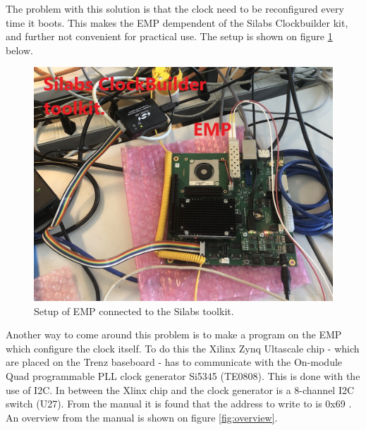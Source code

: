 The problem with this solution is that the clock need to be reconfigured every time it boots. This makes the EMP dempendent of the Silabs Clockbuilder kit, and further not convenient for practical use. The setup is shown on figure \ref{fig:Silabstoolkit} below. 

\begin{figure}[H]
    \centering
    \includegraphics[width=.75\textwidth]{Graphics/IMG_0312.jpg}
    \caption{Setup of EMP connected to the Silabs toolkit.}
    \label{fig:Silabstoolkit}
\end{figure}


Another way to come around this problem is to make a program on the EMP which configure the clock itself. To do this the Xilinx Zynq Ultascale chip - which are placed on the Trenz baseboard - has to communicate with the On-module Quad programmable PLL clock generator Si5345 (TE0808). This is done with the use of I2C. In between the Xlinx chip and the clock generator is a 8-channel I2C switch (U27). From the manual it is found that the address to write to is 0x69 \cite{TEBF080828:online}. An overview from the manual is shown on figure \ref{fig:overview}.


